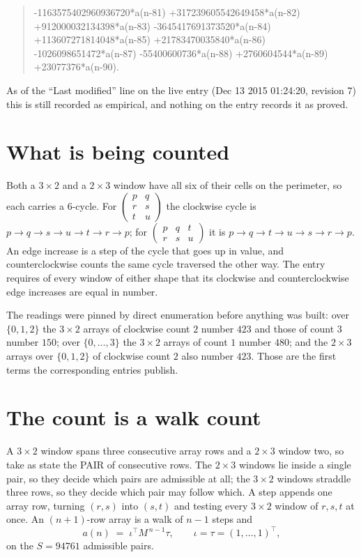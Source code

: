 \documentclass[11pt,a4paper]{article}
\theoremstyle{plain}
\theoremstyle{definition}
\begin{document}
\begin{quote}
-1163575402960936720*a(n-81) +317239605542649458*a(n-82) +912000032134398*a(n-83) -3645417691373520*a(n-84) +113607271814048*a(n-85) +21783470035840*a(n-86) -1026098651472*a(n-87) -55400600736*a(n-88) +2760604544*a(n-89) +23077376*a(n-90).
\end{quote}
As of the ``Last modified'' line on the live entry (Dec 13 2015 01:24:20, revision 7) this is still
recorded as empirical, and nothing on the entry records it as proved.

\section{What is being counted}

Both a $3\times2$ and a $2\times3$ window have all six of their cells on the
perimeter, so each carries a $6$-cycle. For
$\begin{pmatrix}p&q\\r&s\\t&u\end{pmatrix}$ the clockwise cycle is
$p\to q\to s\to u\to t\to r\to p$; for
$\begin{pmatrix}p&q&t\\r&s&u\end{pmatrix}$ it is
$p\to q\to t\to u\to s\to r\to p$. An edge increase is a step of the cycle that goes up in
value, and counterclockwise counts the same cycle traversed the other way. The entry requires
of every window of either shape that its clockwise and counterclockwise edge increases are equal in number.

The readings were pinned by direct enumeration before anything was built: over
$\{0,1,2\}$ the $3\times2$ arrays of clockwise count $2$ number $423$ and those of count
$3$ number $150$; over $\{0,\dots,3\}$ the $3\times2$ arrays of count $1$ number $480$;
and the $2\times3$ arrays over $\{0,1,2\}$ of clockwise count $2$ also number $423$. Those
are the first terms the corresponding entries publish.

\section{The count is a walk count}

A $3\times2$ window spans three consecutive array rows and a $2\times3$
window two, so take as state the PAIR of consecutive rows. The $2\times3$ windows lie inside a
single pair, so they decide which pairs are admissible at all; the $3\times2$ windows straddle
three rows, so they decide which pair may follow which. A step appends one array row, turning
$(r,s)$ into $(s,t)$ and testing every $3\times2$ window of $r,s,t$ at once. An $(n+1)$-row
array is a walk of $n-1$ steps and
\[
a(n)\;=\;\iota^{\!\top}M^{\,n-1}\tau,\qquad\iota=\tau=(1,\dots,1)^{\!\top},
\]
on the $S=94761$ admissible pairs.
\end{document}
